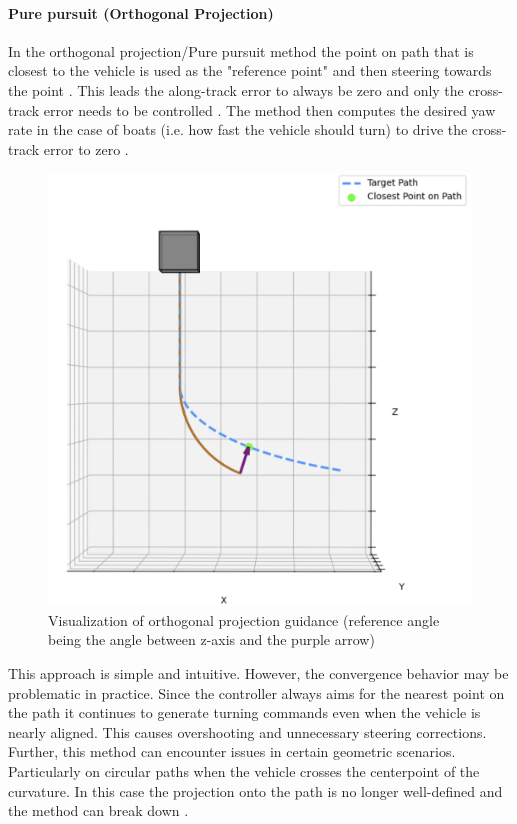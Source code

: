 \paragraph*{Pure pursuit (Orthogonal Projection)}
In the orthogonal projection/Pure pursuit method the point on path that is closest to the vehicle is used as the "reference point" and then steering towards the point \cite{fossen_handbook_2011} \cite{amidi_integrated_1991}. This leads the along-track error to always be zero and only the cross-track error needs to be controlled \cite{hung_review_2023}. The method then computes the desired yaw rate in the case of boats (i.e. how fast the vehicle should turn) to drive the cross-track error to zero \cite{hung_review_2023}. 
\begin{figure} [H]
    \centering
    \includegraphics[width=0.7\linewidth]{images/pythonpictures/purepursuit.png}
    \caption{Visualization of orthogonal projection guidance (reference angle being the angle between z-axis and the purple arrow)}
    \label{fig:purepursuit}
\end{figure}
This approach is simple and intuitive. However, the convergence behavior may be problematic in practice. Since the controller always aims for the nearest point on the path it continues to generate turning commands even when the vehicle is nearly aligned. This causes overshooting and unnecessary steering corrections. Further, this method can encounter issues in certain geometric scenarios. Particularly on circular paths when the vehicle crosses the centerpoint of the curvature. In this case the projection onto the path is no longer well-defined and the method can break down \cite{fossen_handbook_2011}.

